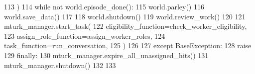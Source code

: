\begin{DoxyCode}
113             )
114             \textcolor{keywordflow}{while} \textcolor{keywordflow}{not} world.episode\_done():
115                 world.parley()
116             world.save\_data()
117 
118             world.shutdown()
119             world.review\_work()
120 
121         mturk\_manager.start\_task(
122             eligibility\_function=check\_worker\_eligibility,
123             assign\_role\_function=assign\_worker\_roles,
124             task\_function=run\_conversation,
125         )
126 
127     \textcolor{keywordflow}{except} BaseException:
128         \textcolor{keywordflow}{raise}
129     \textcolor{keywordflow}{finally}:
130         mturk\_manager.expire\_all\_unassigned\_hits()
131         mturk\_manager.shutdown()
132 
133 
\end{DoxyCode}
